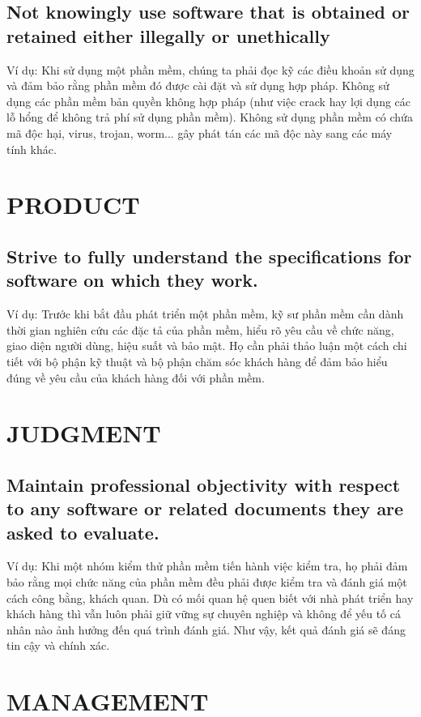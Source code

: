 \documentclass[14pt]{extarticle}
\begin{document}
\subsection{Not knowingly use software that is obtained or retained 
either illegally or unethically}
Ví dụ: Khi sử dụng một phần mềm, chúng ta phải đọc kỹ các điều khoản
sử dụng và đảm bảo rằng phần mềm đó được cài đặt và sử dụng hợp pháp.
Không sử dụng các phần mềm bản quyền không hợp pháp (như việc crack
hay lợi dụng các lỗ hổng để không trả phí sử dụng phần mềm).
Không sử dụng phần mềm có chứa mã độc hại, virus, trojan, worm... 
gây phát tán các mã độc này sang các máy tính khác.

\section{PRODUCT}
\setcounter{subsection}{6}
\subsection{Strive to fully understand the specifications for 
software on which they work.}
Ví dụ: Trước khi bắt đầu phát triển một phần mềm, kỹ sư phần mềm cần
dành thời gian nghiên cứu các đặc tả của phần mềm, hiểu rõ yêu cầu
về chức năng, giao diện người dùng, hiệu suất và bảo mật. Họ cần phải
thảo luận một cách chi tiết với bộ phận kỹ thuật và bộ phận chăm
sóc khách hàng để đảm bảo hiểu đúng về yêu cầu của khách hàng đối với
phần mềm.

\section{JUDGMENT}
\setcounter{subsection}{2}
\subsection{Maintain professional objectivity with respect to any 
software or related documents they are asked to evaluate.}
Ví dụ: Khi một nhóm kiểm thử phần mềm tiến hành việc kiểm tra, họ 
phải đảm bảo rằng mọi chức năng của phần mềm đều phải được kiểm tra
và đánh giá một cách công bằng, khách quan. Dù có mối quan hệ quen biết
với nhà phát triển hay khách hàng thì vẫn luôn phải giữ vững sự chuyên
nghiệp và không để yếu tố cá nhân nào ảnh hưởng đến quá trình đánh giá.
Như vậy, kết quả đánh giá sẽ đáng tin cậy và chính xác.

\section{MANAGEMENT}
\setcounter{subsection}{3}
\end{document}
